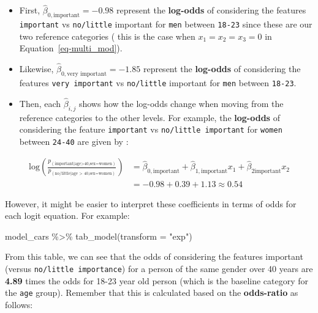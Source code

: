 \documentclass[
  letterpaper,
  DIV=11,
  numbers=noendperiod]{scrartcl}
\newenvironment{Shaded}{\begin{snugshade}}{\end{snugshade}}
\newcommand{\AttributeTok}[1]{\textcolor[rgb]{0.40,0.45,0.13}{#1}}
\newcommand{\FunctionTok}[1]{\textcolor[rgb]{0.28,0.35,0.67}{#1}}
\newcommand{\NormalTok}[1]{\textcolor[rgb]{0.00,0.23,0.31}{#1}}
\newcommand{\SpecialCharTok}[1]{\textcolor[rgb]{0.37,0.37,0.37}{#1}}
\newcommand{\StringTok}[1]{\textcolor[rgb]{0.13,0.47,0.30}{#1}}
\begin{document}
\begin{itemize}
\item
  First, \(\hat{\beta}_{0,\text{important}} = -0.98\) represent the
  \textbf{log-odds} of considering the features \texttt{important} vs
  \texttt{no/little} important for \texttt{men} between \texttt{18-23}
  since these are our two reference categories ( this is the case when
  \(x_{1} = x_2 = x_3 = 0\) in Equation~\ref{eq-multi_mod}).
\item
  Likewise, \(\hat{\beta}_{0,\text{very important}} = -1.85\) represent
  the \textbf{log-odds} of considering the features
  \texttt{very\ important} vs \texttt{no/little} important for
  \texttt{men} between \texttt{18-23}.
\item
  Then, each \(\hat{\beta}_{i,j}\) shows how the log-odds change when
  moving from the reference categories to the other levels. For example,
  the \textbf{log-odds} of considering the feature \texttt{important} vs
  \texttt{no/little\ important} for \texttt{women} between
  \texttt{24-40} are given by :
\end{itemize}

\[
\begin{aligned}
\mathrm{log}\left(\frac{p_{(\text{important|age>40,sex=women})}}{p_{(\text{no/little|age > 40,sex=women})}} \right) &= \hat{\beta}_{0,\text{important}}+\hat{\beta}_{1,\text{important}} x_1 +\hat{\beta}_{2\text{important}}x_2\\
&= -0.98 +  0.39 + 1.13  \approx 0.54
\end{aligned}
\]

However, it might be easier to interpret these coefficients in terms of
odds for each logit equation. For example:

\begin{Shaded}
\begin{Highlighting}[]
\NormalTok{model\_cars }\SpecialCharTok{\%\textgreater{}\%} \FunctionTok{tab\_model}\NormalTok{(}\AttributeTok{transform =} \StringTok{"exp"}\NormalTok{)}
\end{Highlighting}
\end{Shaded}

From this table, we can see that the odds of considering the features
important (versus \texttt{no/little\ importance}) for a person of the
same gender over 40 years are \textbf{4.89} times the odds for 18-23
year old person (which is the baseline category for the \texttt{age}
group). Remember that this is calculated based on the
\textbf{odds-ratio} as follows:
\end{document}
